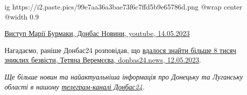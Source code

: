 \ifcmt
  ig https://i2.paste.pics/99e7aa36a3bae73f6c7ffd5b9e65786d.png
  @wrap center
  @width 0.9
\fi

\href{https://www.youtube.com/watch?v=vfUBRKXrfIU}{Виступ Марії Бурмаки, Донбас Новини, youtube, 14.05.2023}

Нагадаємо, раніше Донбас24 розповідав, що \href{https://donbas24.news/news/bilse-8-tisyac-zniklix-bezvisti-vdalosya-znaiti-kotenko}{вдалося знайти більше 8 тисяч зниклих безвісти, Тетяна Веремєєва, donbas24.news, 12.05.2023}.

\emph{Ще більше новин та найактуальніша інформація про Донецьку та Луганську області
в нашому \href{https://t.me/donbas24}{телеграм-каналі Донбас24}.}

